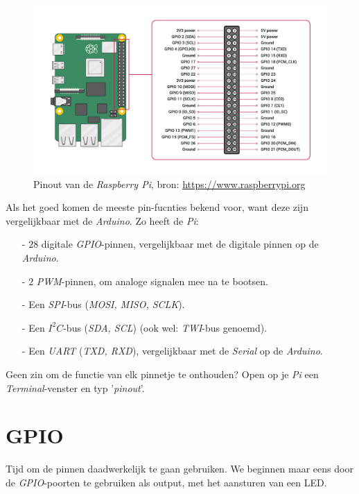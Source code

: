 \begin{figure}[h!]
\centering\includegraphics[scale=0.28]{Pictures/chapter05/pi_pinout.png}
\caption{Pinout van de \textit{Raspberry Pi}, bron: \href{https://www.raspberrypi.org/documentation/usage/gpio/}{https://www.raspberrypi.org}}
\label{fig:pi_header} %
\end{figure}

Als het goed komen de meeste pin-fucnties bekend voor, want deze zijn vergelijkbaar met de \textit{Arduino}. Zo heeft de \textit{Pi}:
\begin{enumerate}
	\item[-] $28$ digitale \textit{GPIO}-pinnen, vergelijkbaar met de digitale pinnen op de \textit{Arduino}.
	\item[-] $2$ \textit{PWM}-pinnen, om analoge signalen mee na te bootsen.
	\item[-] Een \textit{SPI}-bus (\textit{MOSI, MISO, SCLK}).
	\item[-] Een \textit{$I^2C$}-bus (\textit{SDA, SCL}) (ook wel: \textit{TWI}-bus genoemd). 
	\item[-] Een \textit{UART} (\textit{TXD, RXD}), vergelijkbaar met de \textit{Serial} op de \textit{Arduino}.
\end{enumerate}

\begin{exercise}
Geen zin om de functie van elk pinnetje te onthouden? Open op je \textit{Pi} een \textit{Terminal}-venster en typ '\textit{pinout}'.
\end{exercise}

\newpage

\section{GPIO}
Tijd om de pinnen daadwerkelijk te gaan gebruiken. We beginnen maar eens door de \textit{GPIO}\--poorten te gebruiken als output, met het aansturen van een LED.
